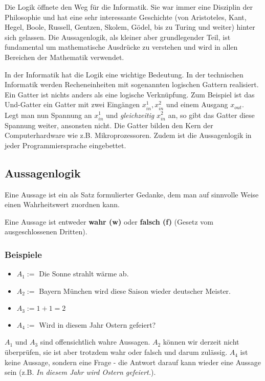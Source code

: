 Die Logik öffnete den Weg für die Informatik. Sie war immer eine Disziplin der Philosophie und hat eine sehr interessante Geschichte (von Aristoteles, Kant, Hegel, Boole, Russell, Gentzen, Skolem, Gödel, bis zu Turing und weiter) hinter sich gelassen. Die Aussagenlogik, als kleiner aber grundlegender Teil, ist fundamental um mathematische Ausdrücke zu verstehen und wird in allen Bereichen der Mathematik verwendet.
\begin{warning}
In der Informatik hat die Logik eine wichtige Bedeutung. In der technischen Informatik werden Recheneinheiten mit sogenannten logischen Gattern realisiert. Ein Gatter ist nichts anders als eine logische Verknüpfung. Zum Beispiel ist das Und-Gatter ein Gatter mit zwei Eingängen $x_{in}^1, x_{in}^2$ und einem Ausgang $x_{out}$.\\
Legt man nun Spannung an $x_{in}^1$ und \textit{gleichzeitig} $x_{in}^2$ an, so gibt das Gatter diese Spannung weiter, ansonsten nicht. Die Gatter bilden den Kern der Computerhardware wie z.B. Mikroprozessoren. Zudem ist die Aussagenlogik in jeder Programmiersprache eingebettet.
\end{warning}

\subsection{Aussagenlogik}
\begin{definition}[Aussage]
Eine Aussage ist ein als Satz formulierter Gedanke, dem man auf sinnvolle Weise einen Wahrheitswert zuordnen kann.
\end{definition}
Eine Aussage ist entweder \textbf{wahr (w)} oder \textbf{falsch (f)} (Gesetz vom ausgeschlossenen Dritten).

\subsubsection*{Beispiele}
\begin{itemize}
\item $A_1 := $ Die Sonne strahlt wärme ab.
\item $A_2 := $ Bayern München wird diese Saison wieder deutscher Meister.
\item $A_3 := 1+1 = 2$
\item $A_4 := $ Wird in diesem Jahr Ostern gefeiert?
\end{itemize}
$A_1$ und $A_3$ sind offensichtlich wahre Aussagen. $A_2$ können wir derzeit nicht überprüfen, sie ist aber trotzdem wahr oder falsch und darum zulässig. $A_4$ ist keine Aussage, sondern eine Frage - die Antwort darauf kann wieder eine Aussage sein (z.B. \textit{In diesem Jahr wird Ostern gefeiert.}).

